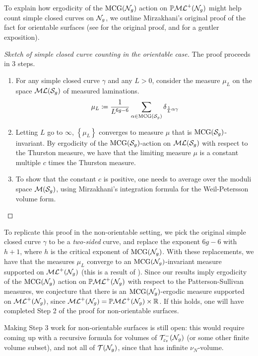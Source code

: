 To explain how ergodicity of the $\mathrm{MCG}(\mathcal{N}_g)$ action on $\mathbb{P}\mathcal{ML}^+(\mathcal{N}_g)$ might help count simple closed curves on $\mathcal{N}_g$, we outline Mirzakhani's original proof of the fact for orientable surfaces (see \cite{mirzakhani2008growth} for the original proof, and \cite{2022arXiv220204156A} for a gentler exposition).

\begin{proof}[Sketch of simple closed curve counting in the orientable case]
  The proof proceeds in 3 steps.
  \begin{enumerate}[Step 1:]
  \item For any simple closed curve $\gamma$ and any $L > 0$, consider the measure $\mu_L$ on the space $\mathcal{ML}(\mathcal{S}_g)$ of measured laminations.
    \begin{align*}
      \mu_L \coloneqq \frac{1}{L^{6g-6}} \sum_{\alpha \in \mathrm{MCG}(\mathcal{S}_g)} \delta_{\frac{1}{L}\alpha \gamma}
    \end{align*}
  \item Letting $L$ go to $\infty$, $\left\{ \mu_L \right\}$ converges to measure $\mu$ that is $\mathrm{MCG}(\mathcal{S}_g)$-invariant.
    By ergodicity of the $\mathrm{MCG}(\mathcal{S}_g)$-action on $\mathcal{ML}(\mathcal{S}_g)$ with respect to the Thurston measure, we have that the limiting measure $\mu$ is a constant multiple $c$ times the Thurston measure.
  \item To show that the constant $c$ is positive, one needs to average over the moduli space $\mathcal{M}(\mathcal{S}_g)$, using Mirzakhani's integration formula for the Weil-Petersson volume form.
  \end{enumerate}
\end{proof}

To replicate this proof in the non-orientable setting, we pick the original simple closed curve $\gamma$ to be a \emph{two-sided} curve, and replace the exponent $6g-6$ with $h + 1$, where $h$ is the critical exponent of $\mathrm{MCG}(\mathcal{N}_g)$.
With these replacements, we have that the measures $\mu_L$ converge to an $\mathrm{MCG}(\mathcal{N}_g)$-invariant measure supported on $\mathcal{ML}^+(\mathcal{N}_g)$ (this is a result of \textcite{erlandsson2023mapping}).
Since our results imply ergodicity of the $\mathrm{MCG}(\mathcal{N}_g)$ action on $\mathbb{P}\mathcal{ML}^+(\mathcal{N}_g)$ with respect to the Patterson-Sullivan measures, we conjecture that there is an $\mathrm{MCG}(\mathcal{N}_g)$-ergodic measure supported on $\mathcal{ML}^+(\mathcal{N}_g)$, since $\mathcal{ML}^+(\mathcal{N}_g) = \mathbb{P}\mathcal{ML}^+(\mathcal{N}_g) \times \mathbb{R}$.
If this holds, one will have completed Step 2 of the proof for non-orientable surfaces.

Making Step 3 work for non-orientable surfaces is still open: this would require coming up with a recursive formula for volumes of $\mathcal{T}_{\varepsilon_t}^{-}(\mathcal{N}_g)$ (or some other finite volume subset), and not all of $\mathcal{T}(\mathcal{N}_g)$, since that has infinite $\nu_N$-volume.

